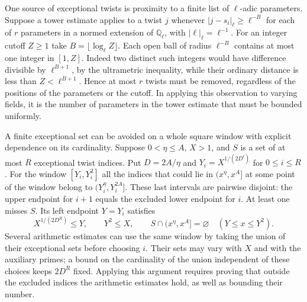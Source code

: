 \documentclass[11pt]{amsart}
\theoremstyle{definition}
\theoremstyle{remark}
\begin{document}
One source of exceptional twists is proximity to a finite list
of $\ell$-adic parameters. Suppose a tower estimate applies to a
twist $j$ whenever $|j-s_i|_\ell\ge\ell^{-B}$ for each of $r$
parameters in a normed extension of $\mathbb Q_\ell$, with
$|\ell|_\ell=\ell^{-1}$. For an integer cutoff $Z\ge1$ take
$B=\lfloor\log_\ell Z\rfloor$. Each open ball of radius $\ell^{-B}$
contains at most one integer in $[1,Z]$. Indeed two distinct such
integers would have difference divisible by $\ell^{B+1}$, by the
ultrametric inequality, while their ordinary distance is less than
$Z<\ell^{B+1}$. Hence at most $r$ twists must be removed, regardless
of the positions of the parameters or the cutoff. In applying this
observation to varying fields, it is the number of parameters in the
tower estimate that must be bounded uniformly.

A finite exceptional set can be avoided on a whole square window
with explicit dependence on its cardinality. Suppose $0<\eta\le A$,
$X>1$, and $S$ is a set of at most $R$ exceptional twist indices.
Put $D=2A/\eta$ and $Y_i=X^{1/(2D^i)}$ for $0\le i\le R$.
For the window $[Y_i,Y_i^2]$ all the indices that could lie in
$(x^\eta,x^A]$ at some point of the window belong to
$(Y_i^\eta,Y_i^{2A}]$. These last intervals are pairwise disjoint:
the upper endpoint for $i+1$ equals the excluded lower endpoint for
$i$. At least one misses $S$. Its left endpoint $Y=Y_i$ satisfies
\[
 X^{1/(2D^R)}\le Y,\qquad Y^2\le X,\qquad
 S\cap(x^\eta,x^A]=\varnothing\quad(Y\le x\le Y^2).
\]
Several arithmetic estimates can use the same window by taking the
union of their exceptional sets before choosing $i$. Their sets may
vary with $X$ and with the auxiliary primes; a bound on the cardinality
of the union independent of these choices keeps $2D^R$ fixed.
Applying this argument requires proving that outside the excluded
indices the arithmetic estimates hold, as well as bounding their number.
\end{document}
